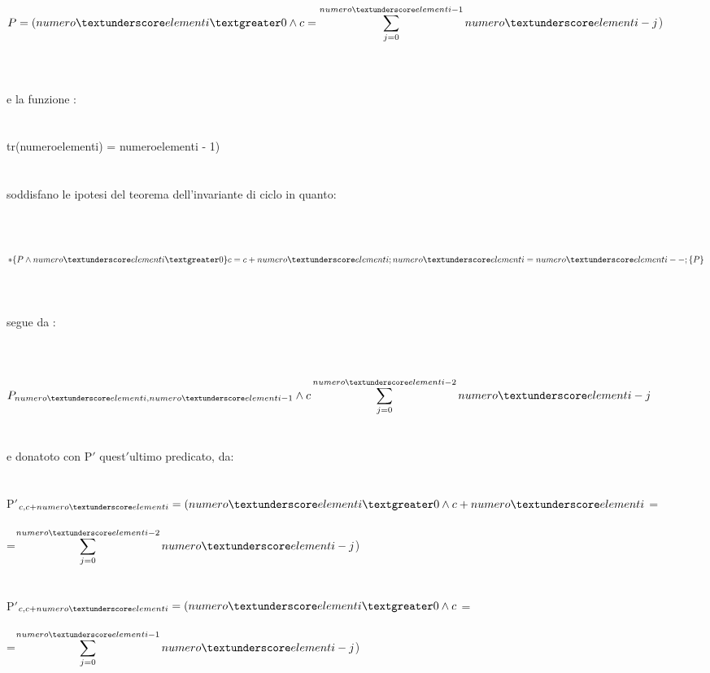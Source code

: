 \documentclass[11pt, a4paper, titlepage, block]{article}
\begin{document}
 $P = (numero\textunderscore elementi \textgreater 0 \wedge c = \displaystyle \sum_{j=0}^{numero\textunderscore elementi-1} numero\textunderscore elementi - j $)\\
 \\ 
 \\
 \\
 e la funzione :
 \\
 \\
 \\
 tr(numero\textunderscore elementi) = numero\textunderscore elementi - 1)
 \\
 \\
 \\
 soddisfano le ipotesi del teorema dell'invariante di ciclo in quanto:\\
 \\
 \\
 \\
 $\ast \lbrace P \wedge numero\textunderscore elementi\textgreater 0 \rbrace c = c + numero\textunderscore elementi; numero\textunderscore elementi = numero\textunderscore elementi - -;\lbrace P \rbrace $ \\
 \\
 \\
 \\
 segue da :\\
 \\
 \\
 \\
 $P_{numero\textunderscore elementi,numero\textunderscore elementi -1} \wedge c \displaystyle \sum_{j=0}^{numero\textunderscore elementi-2} numero\textunderscore elementi - j $
 \\
 \\
 \\
 e donatoto con P$'$ quest$'$ultimo predicato, da:
 \\
 \\
 \\
 P$'$$_{c,c + numero\textunderscore elementi} = (numero\textunderscore elementi \textgreater 0 \wedge c + numero\textunderscore elementi $ = \\\\ =$ \displaystyle \sum_{j=0}^{numero\textunderscore elementi-2} numero\textunderscore elementi - j $)\\
 \\
 \\
 
 P$'$$_{c,c + numero\textunderscore elementi} = (numero\textunderscore elementi \textgreater 0 \wedge c$ =\\\\=$ \displaystyle \sum_{j=0}^{numero\textunderscore elementi-1} numero\textunderscore elementi - j $)\\
 \\
 \\
 
\end{document}
